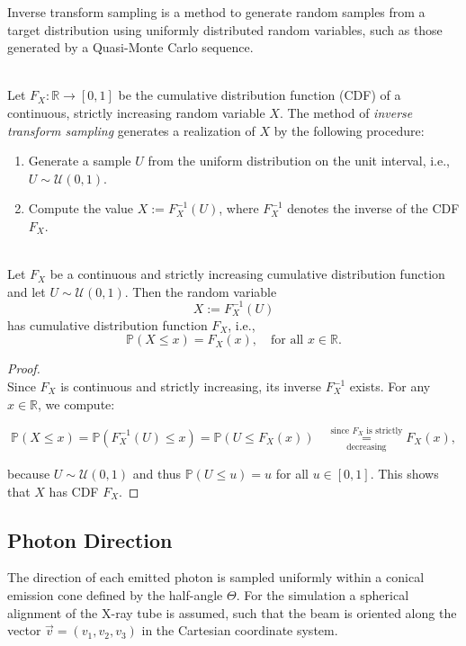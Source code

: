 Inverse transform sampling \cite{muller2012monte} is a method to generate random samples from a target distribution using uniformly distributed random variables, such as those generated by a Quasi-Monte Carlo sequence.

\begin{definition}\ \\
    \label{def:inverse_transform_sampling}
    Let $F_X: \mathbb{R} \to [0,1]$ be the cumulative distribution function (CDF) of a continuous, strictly increasing random variable $X$. The method of \emph{inverse transform sampling} generates a realization of $X$ by the following procedure:

    \begin{enumerate}
        \item Generate a sample $U$ from the uniform distribution on the unit interval, i.e., $U \sim \mathcal{U}(0,1)$.
        \item Compute the value $X := F_X^{-1}(U)$, where $F_X^{-1}$ denotes the inverse of the CDF $F_X$.
    \end{enumerate}
\end{definition}

\begin{theorem}\ \\
Let $F_X$ be a continuous and strictly increasing cumulative distribution function and let $U \sim \mathcal{U}(0,1)$. Then the random variable
\[
X := F_X^{-1}(U)
\]
has cumulative distribution function $F_X$, i.e.,
\[
\mathbb{P}(X \leq x) = F_X(x), \quad \text{for all } x \in \mathbb{R}.
\]
\end{theorem}

\begin{proof}\ \\
Since $F_X$ is continuous and strictly increasing, its inverse $F_X^{-1}$ exists. For any $x \in \mathbb{R}$, we compute:

\[
\mathbb{P}(X \leq x) = \mathbb{P}(F_X^{-1}(U) \leq x)
= \mathbb{P}(U \leq F_X(x)) \quad  \underset{\text{decreasing}}{\overset{\text{since } F_X \text{ is strictly}}{=}} F_X(x),
\]

because \( U \sim \mathcal{U}(0,1) \) and thus \( \mathbb{P}(U \leq u) = u \) for all \( u \in [0,1] \). This shows that \( X \) has CDF \( F_X \).
\end{proof}


\subsection{Photon Direction}
The direction of each emitted photon is sampled uniformly within a conical
emission cone defined by the half-angle $\Theta$. For the simulation a spherical alignment of the X-ray tube is assumed, such that the beam is oriented along the vector $\vec{v} = (v_1,v_2,v_3)$ in the Cartesian coordinate system.

